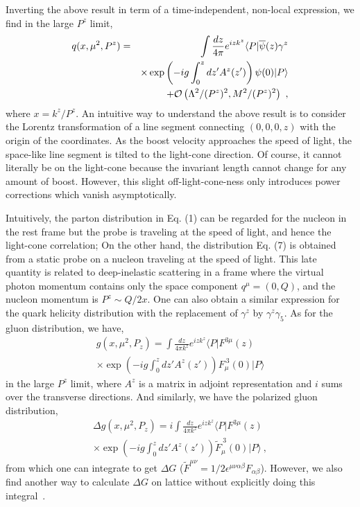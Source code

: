Inverting the above result in term of a time-independent, non-local expression, we find
in the large $P^z$ limit,
\begin{eqnarray}
   q(x,\mu^2, P^z) &=& \int \frac{dz}{4\pi} e^{izk^z}  \langle P|\overline{\psi}(z)
   \gamma^z \\
   && \times \exp\left(-ig\int^{z}_0 dz' A^z(z') \right)\psi(0) |P\rangle \nonumber
 \\ && + {\cal O}\left(\Lambda^2/(P^z)^2,  M^2/(P^z)^2\right) \ ,  \nonumber
\end{eqnarray}
where $x= k^z/P^z$.
An intuitive way to understand the above result is to consider
the Lorentz transformation of a line segment connecting $(0,0,0,z)$ with the origin of the coordinates.
As the boost velocity approaches the speed of light, the space-like line segment is tilted to the
light-cone direction. Of course, it cannot literally be on the light-cone because the invariant length
cannot change for any amount of boost. However, this slight off-light-cone-ness only introduces power corrections
which vanish asymptotically.

Intuitively, the parton distribution in Eq. (1) can be regarded for the nucleon
in the rest frame but the probe is traveling at the speed of light, and hence the light-cone correlation;
On the other hand, the distribution  Eq. (7) is obtained from a static probe on a nucleon traveling at
the speed of light. This late quantity is related to deep-inelastic scattering in a frame where the virtual photon
momentum contains only the space component $q^\mu = (0, Q)$, and the nucleon momentum is $P^z \sim Q/2x$.
One can also obtain a similar expression for the quark helicity distribution with the replacement of
$\gamma^z$ by $\gamma^z\gamma_5$. As for the gluon distribution, we have,
\begin{eqnarray}
g(x,\mu^2, P_z) = \int \frac{dz}{4\pi k^z}
e^{izk^z} \langle P|F^{3\mu}(z)  \\
\times \exp\left(-ig \int^z_0 dz' A^z(z')\right)
F^{~3}_\mu(0)|P\rangle \nonumber
\end{eqnarray}
in the large $P^z$ limit, where $A^z$ is a matrix in adjoint representation and $i$ sums over the transverse directions.
And similarly, we have the polarized gluon distribution,
\begin{eqnarray}
\Delta g(x,\mu^2, P_z) = i\int \frac{dz}{4\pi k^z}
e^{izk^z} \langle P|F^{3\mu}(z)  \\
\times \exp\left(-ig \int^z_0 dz' A^z(z')\right)
\tilde F^{~3}_\mu(0)|P\rangle \nonumber \ ,
\end{eqnarray}
from which one can integrate to get $\Delta G$ ($\tilde F^{\mu\nu} = 1/2 \epsilon^{\mu\nu\alpha\beta}F_{\alpha\beta}$). However, we also find another way to calculate
$\Delta G$ on lattice without explicitly doing this integral~\cite{Ji:2013fga}.

